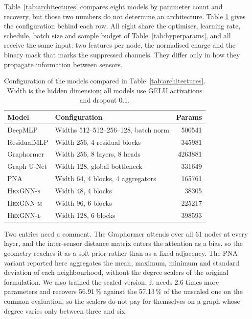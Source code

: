 \documentclass[10pt,conference]{IEEEtran}
\begin{document}
Table~\ref{tab:architectures} compares eight models by parameter count and
recovery, but those two numbers do not determine an architecture. Table
\ref{tab:app-arch} gives the configuration behind each row. All eight share the
optimiser, learning rate, schedule, batch size and sample budget of
Table~\ref{tab:hyperparams}, and all receive the same input: two features per
node, the normalised charge and the binary mask that marks the suppressed
channels. They differ only in how they propagate information between sensors.

\begin{table}[t]
\centering
\caption{Configuration of the models compared in
Table~\ref{tab:architectures}. Width is the hidden dimension; all models use
GELU activations and dropout 0.1.}
\label{tab:app-arch}
\begin{tabular}{@{}llr@{}}
\toprule
\textbf{Model} & \textbf{Configuration} & \textbf{Params} \\
\midrule
DeepMLP           & Widths 512--512--256--128, batch norm & \num{500541} \\
ResidualMLP       & Width 256, 4 residual blocks          & \num{345981} \\
Graphormer        & Width 256, 8 layers, 8 heads          & \num{4263881} \\
Graph U-Net       & Width 128, global bottleneck          & \num{331649} \\
PNA               & Width 64, 4 blocks, 4 aggregators     & \num{165761} \\
\textsc{HexGNN-s} & Width 48, 4 blocks                    & \num{38305} \\
\textsc{HexGNN-m} & Width 96, 6 blocks                    & \num{225217} \\
\textsc{HexGNN-l} & Width 128, 6 blocks                   & \num{398593} \\
\bottomrule
\end{tabular}
\end{table}

Two entries need a comment. The Graphormer attends over all 61 nodes at every
layer, and the inter-sensor distance matrix enters the attention as a bias, so
the geometry reaches it as a soft prior rather than as a fixed adjacency. The
PNA variant reported here aggregates the mean, maximum, minimum and standard
deviation of each neighbourhood, without the degree scalers of the original
formulation. We also trained the scaled version: it needs 2.6 times more
parameters and recovers 56.91\,\% against the 57.13\,\% of the unscaled one on
the common evaluation, so the scalers do not pay for themselves on a graph
whose degree varies only between three and six.
\end{document}
